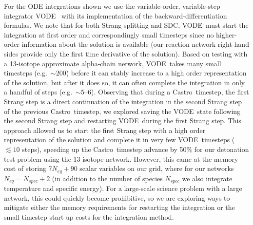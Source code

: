 \documentclass[a4paper]{jpconf}
\newcommand{\castro}{{\sffamily Castro}}
\newcommand{\vode}{{\sffamily VODE}}
\begin{document}
For the ODE integrations shown we use the variable-order,
variable-step integrator \vode\ \cite{vode} with its implementation of
the backward-differentiation formulas.
We note that for both
Strang splitting and SDC, \vode\ must start the integration at first
order and correspondingly small timesteps since no higher-order
information about the solution is available (our reaction
network right-hand sides provide only the first time derivative of the
solution). Based on testing with a 13-isotope
approximate alpha-chain network, \vode\ takes many small timesteps
(e.g.\ $\sim 200$) before it can stably increase to a high order
representation of the solution, but after it does so, it can often
complete the integration in only a handful of steps (e.g.\ $\sim
5$--$6$). Observing that during a \castro\ timestep, the first Strang
step is a direct continuation of the integration in the second Strang
step of the previous \castro\ timestep, we explored saving the
\vode\ state following the second Strang step and restarting
\vode\ during the first Strang step. This approach allowed us to start
the first Strang step with a high order representation of the solution
and complete it in very few \vode\ timesteps ($\lesssim 10$ steps),
speeding up the \castro\ timestep advance by 50\% for our detonation
test problem using the 13-isotope network. However, this came at the
memory cost of storing $7 N_{eq} + 90$ scalar variables on our grid,
where for our networks $N_{eq} = N_{spec} + 2$ (in addition to the
number of species $N_{spec}$ we also integrate temperature and
specific energy). For a large-scale science problem with a large
network, this could quickly become prohibitive, so we are exploring
ways to mitigate either the memory requirements for restarting the
integration or the small timestep start up costs for the integration
method.
\end{document}
